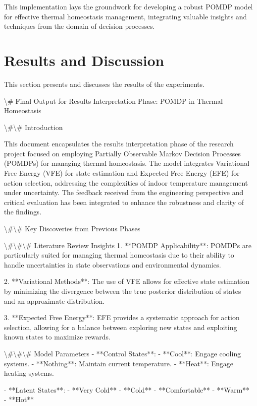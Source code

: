 \documentclass[11pt,a4paper]{article}
\begin{document}
This implementation lays the groundwork for developing a robust POMDP model for effective thermal homeostasis management, integrating valuable insights and techniques from the domain of decision processes.
\section{Results and Discussion}

This section presents and discusses the results of the experiments.

\textbackslash{}# Final Output for Results Interpretation Phase: POMDP in Thermal Homeostasis

\textbackslash{}#\textbackslash{}# Introduction

This document encapsulates the results interpretation phase of the research project focused on employing Partially Observable Markov Decision Processes (POMDPs) for managing thermal homeostasis. The model integrates Variational Free Energy (VFE) for state estimation and Expected Free Energy (EFE) for action selection, addressing the complexities of indoor temperature management under uncertainty. The feedback received from the engineering perspective and critical evaluation has been integrated to enhance the robustness and clarity of the findings.

\textbackslash{}#\textbackslash{}# Key Discoveries from Previous Phases

\textbackslash{}#\textbackslash{}#\textbackslash{}# Literature Review Insights
1. **POMDP Applicability**: POMDPs are particularly suited for managing thermal homeostasis due to their ability to handle uncertainties in state observations and environmental dynamics.
   
2. **Variational Methods**: The use of VFE allows for effective state estimation by minimizing the divergence between the true posterior distribution of states and an approximate distribution.

3. **Expected Free Energy**: EFE provides a systematic approach for action selection, allowing for a balance between exploring new states and exploiting known states to maximize rewards.

\textbackslash{}#\textbackslash{}#\textbackslash{}# Model Parameters
- **Control States**:
  - **Cool**: Engage cooling systems.
  - **Nothing**: Maintain current temperature.
  - **Heat**: Engage heating systems.

- **Latent States**:
  - **Very Cold**
  - **Cold**
  - **Comfortable**
  - **Warm**
  - **Hot**
\end{document}
